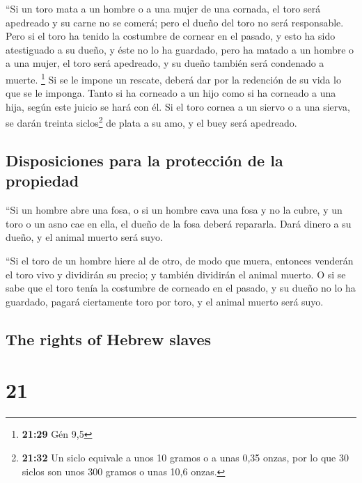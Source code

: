 \begin{paracol}{2}
 ``Si un toro mata a un hombre o a una mujer de una
cornada, el toro será apedreado y su carne no se comerá; pero el dueño
del toro no será responsable.  Pero si el toro ha tenido
la costumbre de cornear en el pasado, y esto ha sido atestiguado a su
dueño, y éste no lo ha guardado, pero ha matado a un hombre o a una
mujer, el toro será apedreado, y su dueño también será condenado a
muerte. \footnote{\textbf{21:29} Gén 9,5}  Si se le
impone un rescate, deberá dar por la redención de su vida lo que se le
imponga.  Tanto si ha corneado a un hijo como si ha
corneado a una hija, según este juicio se hará con él. 
Si el toro cornea a un siervo o a una sierva, se darán treinta
siclos\footnote{\textbf{21:32} Un siclo equivale a unos 10 gramos o a
  unas 0,35 onzas, por lo que 30 siclos son unos 300 gramos o unas 10,6
  onzas.} de plata a su amo, y el buey será apedreado.

\hypertarget{disposiciones-para-la-protecciuxf3n-de-la-propiedad}{%
\subsection{Disposiciones para la protección de la
propiedad}\label{disposiciones-para-la-protecciuxf3n-de-la-propiedad}}

 ``Si un hombre abre una fosa, o si un hombre cava una
fosa y no la cubre, y un toro o un asno cae en ella,  el
dueño de la fosa deberá repararla. Dará dinero a su dueño, y el animal
muerto será suyo.

 ``Si el toro de un hombre hiere al de otro, de modo que
muera, entonces venderán el toro vivo y dividirán su precio; y también
dividirán el animal muerto.  O si se sabe que el toro
tenía la costumbre de corneado en el pasado, y su dueño no lo ha
guardado, pagará ciertamente toro por toro, y el animal muerto será
suyo.

\switchcolumn
\begin{otherlanguage}{english}

\hypertarget{the-rights-of-hebrew-slaves}{%
\subsection{The rights of Hebrew
slaves}\label{the-rights-of-hebrew-slaves}}

\hypertarget{section-41}{%
\section{21}\label{section-41}}


\end{otherlanguage}
\end{paracol}
